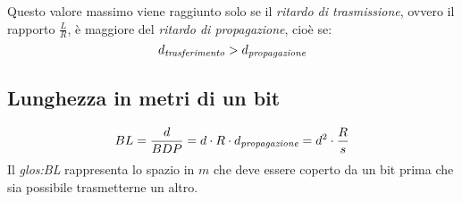 \begin{appendices}
Questo valore massimo viene raggiunto solo se il \emph{ritardo di trasmissione},
ovvero il rapporto $\frac{L}{R}$, è maggiore del \emph{ritardo di propagazione},
cioè se:
\[d_{\emph{trasferimento}}>d_{\emph{propagazione}}\]

\subsection{Lunghezza in metri di un bit}\label{ssec:num4}
\[BL=\frac{d}{BDP}=d\cdot R\cdot d_{\emph{propagazione}}=d^2\cdot\frac{R}{s}\]
Il \emph{\gls{glos:BL}} rappresenta lo spazio in $m$ che deve essere coperto
da un bit prima che sia possibile trasmetterne un altro.

\end{appendices}